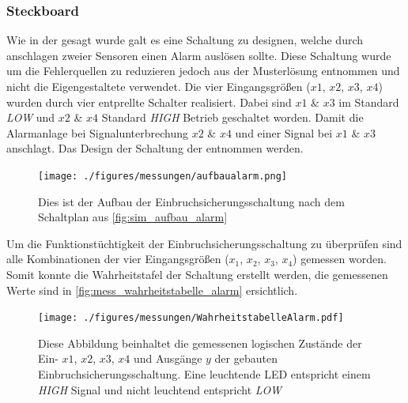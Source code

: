 \documentclass[12pt,english,ngerman]{scrartcl}
\begin{document}
\subsubsection{Steckboard}
Wie in der  gesagt wurde galt es eine Schaltung
zu designen, welche durch anschlagen zweier Sensoren einen Alarm auslösen
sollte. Diese Schaltung wurde um die Fehlerquellen zu reduzieren jedoch aus der
Musterlösung entnommen und nicht die Eigengestaltete verwendet. Die vier
Eingangsgrößen ($x1$, $x2$, $x3$, $x4$) wurden durch vier entprellte
Schalter realisiert. Dabei sind $x1$ \& $x3$ im Standard \textit{LOW} und
$x2$ \& $x4$ Standard \textit{HIGH} Betrieb geschaltet worden. Damit die
Alarmanlage bei Signalunterbrechung $x2$ \& $x4$ und einer Signal bei $x1$
\& $x3$ anschlagt. Das Design der Schaltung der 
entnommen werden.

\begin{figure}[H]
  \centering
    \texttt{[image: ./figures/messungen/aufbaualarm.png]}
  \caption{Dies ist der Aufbau der Einbruchsicherungsschaltung nach dem
  Schaltplan aus \autoref{fig:sim_aufbau_alarm}}
  \label{fig:mess_aufbau_alarm}
\end{figure}

Um die Funktionstüchtigkeit der Einbruchsicherungsschaltung zu überprüfen
sind alle Kombinationen der vier Eingangsgrößen ($x_1$, $x_2$, $x_3$, $x_4$)
gemessen worden. Somit konnte die Wahrheitstafel der Schaltung erstellt werden,
die gemessenen Werte sind in \autoref{fig:mess_wahrheitstabelle_alarm}
ersichtlich.

\begin{figure}[H]
  \centering
    \texttt{[image: ./figures/messungen/WahrheitstabelleAlarm.pdf]}
  \caption{Diese Abbildung beinhaltet die gemessenen logischen Zustände der
    Ein- $x1$, $x2$, $x3$, $x4$ und Ausgänge $y$ der gebauten
    Einbruchsicherungsschaltung. Eine leuchtende LED entspricht einem
    \textit{HIGH} Signal und nicht leuchtend entspricht \textit{LOW}}
  \label{fig:mess_wahrheitstabelle_alarm}
\end{figure}
\end{document}
